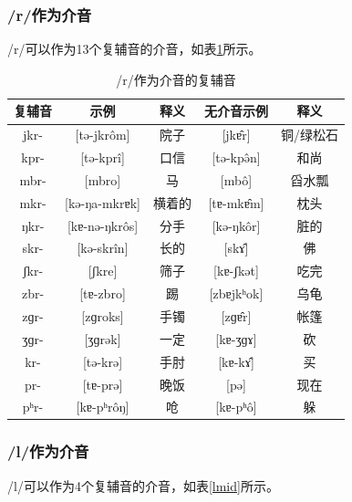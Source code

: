 \subsubsection{/r/作为介音}

/r/可以作为13个复辅音的介音，如表\ref{rmid}所示。

\begin{table}[H]
\vspace{5pt}
    \centering
    \caption{/r/作为介音的复辅音}
    \label{rmid}
\begin{tabular}{c|cccc}
     \toprule
复辅音   & 示例              & 释义   & 无介音示例          & 释义        \\
     \midrule
	jkr- & {[}tə-jkrôm{]}    & 院子  & {[}jkɐ̂r{]}    & 铜/绿松石 \\
kpr- & {[}tə-kprî{]}     & 口信  & {[}tə-kpə̂n{]} & 和尚    \\
mbr- & {[}mbro{]}         & 马   & {[}mbô{]}     & 舀水瓢   \\
mkr- & {[}kə-ŋa-mkrɐk{]}  & 横着的 & {[}tɐ-mkɐ̂m{]} & 枕头    \\
ŋkr- & {[}kɐ-nə-ŋkrôs{]} & 分手  & {[}kə-ŋkôr{]} & 脏的    \\
skr- & {[}kə-skrîn{]}    & 长的  & {[}skɤ̂{]}     & 佛     \\
ʃkr- & {[}ʃkre{]}         & 筛子  & {[}kɐ-ʃkət{]}  & 吃完    \\
zbr- & {[}tɐ-zbro{]}      & 踢   & {[}zbɐjkʰok{]} & 乌龟    \\
zɡr- & {[}zɡroks{]}       & 手镯  & {[}zɡɐ̂r{]}    & 帐篷    \\
ʒɡr- & {[}ʒɡrək{]}        & 一定  & {[}kɐ-ʒɡɤ{]}   & 砍     \\
kr-  & {[}tə-krə{]}       & 手肘  & {[}kɐ-kɤ̂{]}   & 买     \\
pr-  & {[}tɐ-prə{]}       & 晚饭  & {[}pə{]}       & 现在    \\
pʰr- & {[}kɐ-pʰrôŋ{]}    & 呛   & {[}kɐ-pʰô{]}  & 躲    \\
   \bottomrule
\end{tabular}
\end{table}

\subsubsection{/l/作为介音}

/l/可以作为4个复辅音的介音，如表\ref{lmid}所示。

